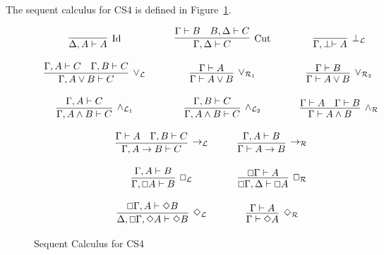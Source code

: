 \documentclass{article}
\renewcommand{\Box}{\oblong}
\begin{document}
The sequent calculus for CS4 is defined in Figure~\ref{fig:CS4-seq}.
\begin{figure}
  \begin{center}
    \begin{math}
      \begin{array}{c}
        \begin{array}{cccccccc}
          \infer[\text{Id}]{\Delta,A \vdash A}{
            \,
          }
          & \quad &
          \infer[\text{Cut}]{\Gamma,\Delta \vdash C}{
            \Gamma \vdash B
            &
            B,\Delta \vdash C
          }
          & \quad & 
          \infer[\perp_{\mathcal{L}}]{\Gamma,\perp \vdash A}{
            \,
          }\\\\
          \infer[\lor_{\mathcal{L}}]{\Gamma,A \lor B \vdash C}{
            \Gamma,A \vdash C
            &
            \Gamma,B \vdash C
          }
          & \quad &
          \infer[\lor_{\mathcal{R}_1}]{\Gamma \vdash A \lor B}{
            \Gamma \vdash A
          }
          & \quad &
          \infer[\lor_{\mathcal{R}_2}]{\Gamma \vdash A \lor B}{
            \Gamma \vdash B
          }\\\\
          \infer[\land_{\mathcal{L}_1}]{\Gamma,A \land B \vdash C}{
            \Gamma,A \vdash C
          }
          & \quad &
          \infer[\land_{\mathcal{L}_2}]{\Gamma,A \land B \vdash C}{
            \Gamma,B \vdash C
          }
          & \quad &
          \infer[\land_{\mathcal{R}}]{\Gamma \vdash A \land B}{
            \Gamma \vdash A
            &
            \Gamma \vdash B
          }\\\\
          
        \end{array}
        \\
        \begin{array}{cccccccc}
          \infer[\to_{\mathcal{L}}]{\Gamma,A \to B \vdash C}{
            \Gamma \vdash A
            &
            \Gamma,B \vdash C
          }
          & \quad &
          \infer[\to_{\mathcal{R}}]{\Gamma \vdash A \to B}{
            \Gamma, A \vdash B
          }\\\\
          \infer[\Box_{\mathcal{L}}]{\Gamma, \Box A \vdash B}{
            \Gamma,A \vdash B
          }
          & \quad &
          \infer[\Box_{\mathcal{R}}]{\Box\Gamma,\Delta \vdash \Box A}{
            \Box \Gamma \vdash A
          }\\\\
          \infer[\Diamond_{\mathcal{L}}]{\Delta,\Box\Gamma,\Diamond A \vdash \Diamond B}{
            \Box\Gamma,A \vdash \Diamond B
          }
          & \quad &
          \infer[\Diamond_{\mathcal{R}}]{\Gamma \vdash \Diamond A}{
            \Gamma \vdash A
          }
        \end{array}        
      \end{array}
    \end{math}
  \end{center}
  \caption{Sequent Calculus for CS4}
  \label{fig:CS4-seq}
\end{figure}
\end{document}
